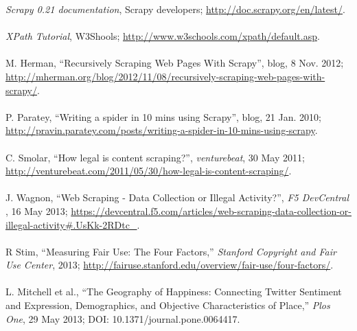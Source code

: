 \documentclass[12pt]{report}
\begin{document}
\begin{thebibliography}{9}

\textit{Scrapy 0.21 documentation}, Scrapy developers; \url{http://doc.scrapy.org/en/latest/}.\\\\

\textit{XPath Tutorial}, W3Shools; \url{http://www.w3schools.com/xpath/default.asp}.\\\\

M. Herman, ``Recursively Scraping Web Pages With Scrapy'', blog, 8 Nov. 2012; \url{http://mherman.org/blog/2012/11/08/recursively-scraping-web-pages-with-scrapy/}.\\\\

P. Paratey, ``Writing a spider in 10 mins using Scrapy'', blog, 21 Jan. 2010; \url{http://pravin.paratey.com/posts/writing-a-spider-in-10-mins-using-scrapy}.\\\\

C. Smolar, ``How legal is content scraping?'', \textit{venturebeat}, 30 May 2011; \url{http://venturebeat.com/2011/05/30/how-legal-is-content-scraping/}.\\\\

J. Wagnon, ``Web Scraping - Data Collection or Illegal Activity?'', \textit{F5 DevCentral }, 16 May 2013; \url{https://devcentral.f5.com/articles/web-scraping-data-collection-or-illegal-activity#.UsKk-2RDtc_}.\\\\

R Stim, ``Measuring Fair Use: The Four Factors,'' \textit{Stanford Copyright and Fair Use Center}, 2013; \url{http://fairuse.stanford.edu/overview/fair-use/four-factors/}. \\\\

L. Mitchell et al., ``The Geography of Happiness: Connecting Twitter Sentiment and Expression, Demographics, and Objective Characteristics of Place,'' \textit{Plos One}, 29 May 2013; DOI: 10.1371/journal.pone.0064417. \\\\

\end{thebibliography}
\end{document}
